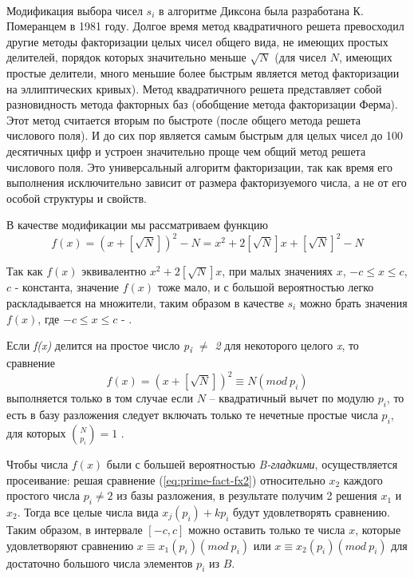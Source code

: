 \paragraph{} Модификация выбора чисел $s_{i}$ в алгоритме Диксона была разработана К. Померанцем в 1981 году. Долгое время метод квадратичного решета 
превосходил другие методы факторизации целых чисел общего вида, не имеющих простых делителей, порядок которых значительно меньше $\sqrt{N}$ 
(для чисел $N$, имеющих простые делители, много меньшие более быстрым является метод факторизации на эллиптических кривых). 
Метод квадратичного решета представляет собой разновидность метода факторных баз (обобщение метода факторизации Ферма). 
Этот метод считается вторым по быстроте (после общего метода решета числового поля). И до сих пор является самым быстрым для 
целых чисел до 100 десятичных цифр и устроен значительно проще чем общий метод решета числового поля. Это универсальный алгоритм факторизации, 
так как время его выполнения исключительно зависит от размера факторизуемого числа, а не от его особой структуры и свойств.

  В качестве модификации мы рассматриваем функцию    
    \begin{equation} \label{eq:prime-fact-fx1}
      f(x) = (x + [\sqrt{N}])^{2} - N = x^{2} + 2[\sqrt{N}]x + [\sqrt{N}]^{2} - N
    \end{equation}    

  Так как $f(x)$ эквивалентно $x^{2} + 2[\sqrt{N}]x$, при малых значениях $x$, $-c \le x \le c$, $c$ - константа, значение $f(x)$ тоже мало, и с большой вероятностью легко раскладывается на множители, таким образом в качестве $s_{i}$ можно брать значения $f(x)$, где $-c \le x \le c$ -
  \cite[Глава 6.4, страница 222]{mah06}.
  
  Если \textit{f(x)} делится на простое число \textit{p\textsubscript{i} {$\ne$} 2} для некоторого целого \textit{x}, то сравнение  
    \begin{equation} \label{eq:prime-fact-fx2}
      f(x) = (x + [\sqrt{N}])^{2} \equiv N(mod \: p_{i})
    \end{equation}    
  выполняется только в том случае если $N$ – квадратичный вычет по модулю $p_{i}$, то есть в базу разложения следует включать 
  только те нечетные простые числа $p_{i}$, для которых $\binom{N}{p_{i}} = 1$ \cite[Глава 6.4, страница 223]{mah06}.
  
  Чтобы числа $f(x)$ были с большей вероятностью \textit{B-гладкими}, осуществляется просеивание: решая сравнение (\ref{eq:prime-fact-fx2}) относительно $x_{2}$
  каждого простого числа $p_{i} \ne 2$ из базы разложения, в результате получим 2 решения $x_{1}$ и $x_{2}$. 
  Тогда все целые числа вида $x_{j}(p_{i}) + k p_{i}$ будут удовлетворять сравнению. Таким образом, в 
  интервале $[-c, c]$ можно оставить только те числа $x$, которые удовлетворяют сравнению $x \equiv x_{1}(p_{i})(mod \: p_{i})$ 
  или $x \equiv x_{2}(p_{i})(mod \: p_{i})$ для достаточно большого числа элементов 
  $p_{i}$ из $B$.
  
